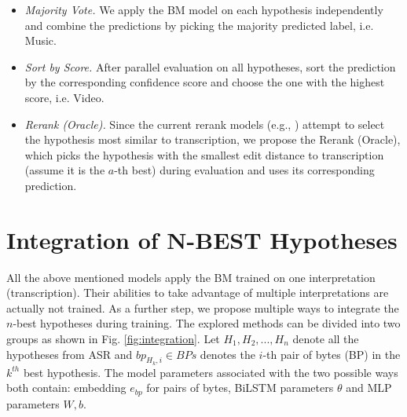 \begin{itemize}
	\item \textit{Majority Vote.} We apply the BM model on each hypothesis independently and combine the predictions by picking the majority predicted label, i.e. Music.
	\vspace{-1ex}
	\item \textit{Sort by Score.} After parallel evaluation on all hypotheses, sort the prediction by the corresponding confidence score and choose the one with the highest score, i.e. Video.
	\vspace{-1ex}
	\item \textit{Rerank (Oracle).} 
	Since the current rerank models (e.g., \citep{peng2013search, charniak2005coarse, morbini2012reranking}) attempt to select the hypothesis most similar to transcription, we propose the Rerank (Oracle), which picks the hypothesis with the smallest edit distance to transcription (assume it is the $a$-th best) during evaluation and uses its corresponding prediction. 
	
\end{itemize}


\section{Integration of N-BEST Hypotheses}
\label{speech:models}
All the above mentioned models apply the BM trained on one interpretation (transcription). Their abilities to take advantage of multiple interpretations are actually not trained. As a further step, we propose multiple ways to integrate the $n$-best hypotheses during training. The explored methods can be divided into two groups as shown in Fig. \ref{fig:integration}. Let $H_1, H_2,..., H_n $ denote all the hypotheses from ASR and $bp_{H_k, i} \in BPs$ denotes the $i$-th pair of bytes (BP) in the $k^{th}$ best hypothesis. The model parameters associated with the two possible ways both contain: embedding $e_{bp}$ for pairs of bytes, BiLSTM parameters $\theta$ and MLP parameters $W, b$.

